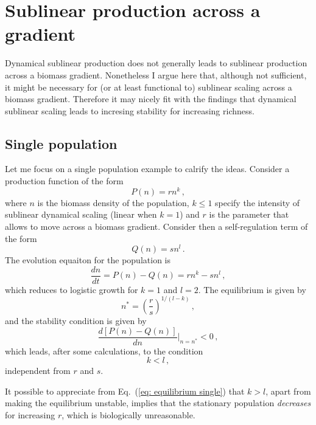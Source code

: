 \documentclass[10pt]{article}
\begin{document}
\section{Sublinear production across a gradient}
Dynamical sublinear production does not generally leads to 
sublinear production across a biomass gradient.
Nonetheless I argue here that, although not sufficient, it might be necessary for (or at least
functional to) sublinear scaling across a biomass gradient.
Therefore it may nicely fit with the findings that dynamical sublinear
scaling leads to incresing stability for increasing richness.

\subsection{Single population}
Let me focus on a single population example to calrify the ideas.
Consider a production function of the form
\begin{equation}
    P(n) = r n^k \, ,
\label{eq: production}
\end{equation}
where $n$ is the biomass density of the population, $k\leq1$
specify the intensity of sublinear dynamical scaling (linear when $k=1$) 
and $r$ is the parameter that allows to move across a biomass gradient.
Consider then a self-regulation term of the form
\begin{equation}
    Q(n) = s n^l \, .
\end{equation} 
The evolution equaiton for the population is 
\begin{equation}
    \frac{dn}{dt} = P(n) - Q(n) = r n^k - s n^l \, ,
\end{equation} 
which reduces to logistic growth for $k=1$ and $l=2$.
The equilibrium is given by
\begin{equation}
    n^* = \left(\frac{r}{s}\right)^{1/(l-k)} \, ,
\label{eq: equilibrium single}
\end{equation}
and the stability condition is given by
\begin{equation}
    \frac{d\left[P(n)-Q(n)\right]}{dn}\bigg|_{n=n^*} < 0 \, ,
\end{equation}
which leads, after some calculations, to the condition
\begin{equation}
    k<l \, ,
\end{equation}
independent from $r$ and $s$.

It possible to appreciate from Eq.~(\ref{eq: equilibrium single})
that $k>l$, apart from making the equilibrium unstable, implies that
the stationary population \textit{decreases} for increasing $r$,
which is biologically unreasonable.
\end{document}
